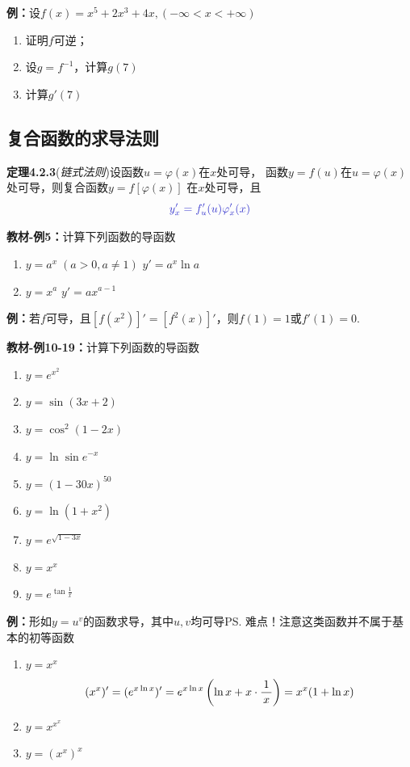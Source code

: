 {\bf 例：}设$f(x)=x^5+2x^3+4x,(-\infty<x<+\infty)$
\begin{enumerate}[(1)]
  \setlength{\itemindent}{1cm}
  \item 证明$f$可逆；
  \item 设$g=f^{-1}$，计算$g(7)$
  \item 计算$g'(7)$
\end{enumerate}

\subsection{复合函数的求导法则}

{\bf 定理4.2.3}({\it 链式法则})设函数$u=\varphi(x)$在$x$处可导，
函数$y=f(u)$在$u=\varphi(x)$处可导，则复合函数$y=f[\varphi(x)]$
在$x$处可导，且
$${\b y'_x=f_u'(u)\varphi_x'(x)}$$

{\bf 教材-例5：}计算下列函数的导函数
\begin{enumerate}[(1)]
  \setlength{\itemindent}{1cm}
  \item $y=a^x\;(a>0,a\ne 1)$ \hfill $y'=a^x\ln a$ 
  \item $y=x^a$ \hfill $y'=ax^{a-1}$
\end{enumerate}

{\bf 例：}若$f$可导，且$[f(x^2)]'=[f^2(x)]'$，则$f(1)=1$或$f'(1)=0$.

{\bf 教材-例10-19：}计算下列函数的导函数
\begin{enumerate}[(1)]
  \setlength{\itemindent}{1cm}
  \item $y=e^{x^2}$ 
  \item $y=\sin (3x+2)$ 
  \item $y=\cos^2(1-2x)$ 
  \item $y=\ln\sin e^{-x}$ 
  \item $y=(1-30x)^{50}$ 
  \item $y=\ln(1+x^2)$ 
  \item $y=e^{\sqrt{1-3x}}$ 
  \item $y=x^x$ 
  \item $y=e^{\tan\frac 1x}$
\end{enumerate}

{\b{\bf 例：}形如$y=u^v$的函数求导，其中$u,v$均可导\ps{难点！注意这类函数并不属于基本的初等函数}
\begin{enumerate}[(1)]
  \setlength{\itemindent}{1cm}
  \item $y=x^x$
  $$(x^x)'=(e^{x\ln x})'=e^{x\ln x}\left(\ln x+x\cdot\displaystyle\frac{\,{1}\,}{\,{x}\,}\right)=x^x(1+\ln x)$$
  \item $y=x^{x^x}$
  \item $y=\left(x^x\right)^x$
\end{enumerate}
}

